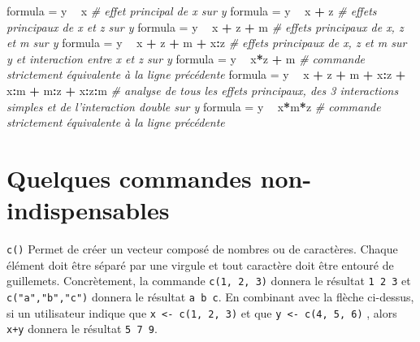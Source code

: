 \documentclass[
]{book}
\newenvironment{Shaded}{\begin{snugshade}}{\end{snugshade}}
\newcommand{\CommentTok}[1]{\textcolor[rgb]{0.56,0.35,0.01}{\textit{#1}}}
\newcommand{\NormalTok}[1]{#1}
\newcommand{\OperatorTok}[1]{\textcolor[rgb]{0.81,0.36,0.00}{\textbf{#1}}}
\newcommand{\StringTok}[1]{\textcolor[rgb]{0.31,0.60,0.02}{#1}}
\begin{document}
\begin{Shaded}
\begin{Highlighting}[]
\NormalTok{formula =}\StringTok{ }\NormalTok{y }\OperatorTok{~}\StringTok{ }\NormalTok{x }\CommentTok{# effet principal de x sur y }
\NormalTok{formula =}\StringTok{ }\NormalTok{y }\OperatorTok{~}\StringTok{ }\NormalTok{x }\OperatorTok{+}\StringTok{ }\NormalTok{z }\CommentTok{# effets principaux de x et z sur y }
\NormalTok{formula =}\StringTok{ }\NormalTok{y }\OperatorTok{~}\StringTok{ }\NormalTok{x }\OperatorTok{+}\StringTok{ }\NormalTok{z }\OperatorTok{+}\StringTok{ }\NormalTok{m }\CommentTok{# effets principaux de x, z et m sur y }
\NormalTok{formula =}\StringTok{ }\NormalTok{y }\OperatorTok{~}\StringTok{ }\NormalTok{x }\OperatorTok{+}\StringTok{ }\NormalTok{z }\OperatorTok{+}\StringTok{ }\NormalTok{m }\OperatorTok{+}\StringTok{ }\NormalTok{x}\OperatorTok{:}\NormalTok{z }\CommentTok{# effets principaux de x, z et m sur y et interaction entre x et z sur y}
\NormalTok{formula =}\StringTok{ }\NormalTok{y }\OperatorTok{~}\StringTok{ }\NormalTok{x}\OperatorTok{*}\NormalTok{z }\OperatorTok{+}\StringTok{ }\NormalTok{m }\CommentTok{# commande strictement équivalente à la ligne précédente}
\NormalTok{formula =}\StringTok{ }\NormalTok{y }\OperatorTok{~}\StringTok{ }\NormalTok{x }\OperatorTok{+}\StringTok{ }\NormalTok{z }\OperatorTok{+}\StringTok{ }\NormalTok{m }\OperatorTok{+}\StringTok{ }\NormalTok{x}\OperatorTok{:}\NormalTok{z }\OperatorTok{+}\StringTok{ }\NormalTok{x}\OperatorTok{:}\NormalTok{m }\OperatorTok{+}\StringTok{ }\NormalTok{m}\OperatorTok{:}\NormalTok{z }\OperatorTok{+}\StringTok{ }\NormalTok{x}\OperatorTok{:}\NormalTok{z}\OperatorTok{:}\NormalTok{m }\CommentTok{# analyse de tous les effets principaux, des 3 interactions simples et de l'interaction double sur y}
\NormalTok{formula =}\StringTok{ }\NormalTok{y }\OperatorTok{~}\StringTok{ }\NormalTok{x}\OperatorTok{*}\NormalTok{m}\OperatorTok{*}\NormalTok{z }\CommentTok{# commande strictement équivalente à la ligne précédente}
\end{Highlighting}
\end{Shaded}

\hypertarget{quelques-commandes-non-indispensables}{%
\section{Quelques commandes non-indispensables}\label{quelques-commandes-non-indispensables}}

\texttt{c()} Permet de créer un vecteur composé de nombres ou de caractères. Chaque élément doit être séparé par une virgule et tout caractère doit être entouré de guillemets. Concrètement, la commande \texttt{c(1,\ 2,\ 3)} donnera le résultat \texttt{1\ 2\ 3} et \texttt{c("a","b","c")} donnera le résultat \texttt{a\ b\ c}.
En combinant avec la flèche ci-dessus, si un utilisateur indique que \texttt{x\ \textless{}-\ c(1,\ 2,\ 3)} et que
\texttt{y\ \textless{}-\ c(4,\ 5,\ 6)} , alors \texttt{x+y} donnera le résultat \texttt{5\ 7\ 9}.
\end{document}
